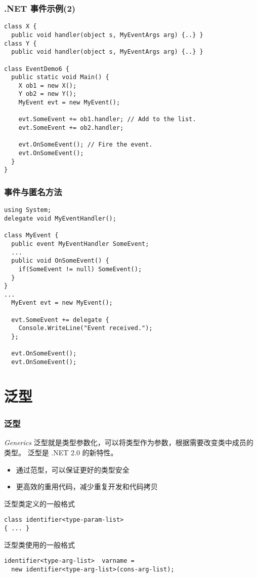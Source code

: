 \begin{frame}[fragile]
\frametitle{.NET 事件示例(2)}
\begin{lstlisting}
class X {
  public void handler(object s, MyEventArgs arg) {..} }
class Y {
  public void handler(object s, MyEventArgs arg) {..} }

class EventDemo6 {
  public static void Main() {
    X ob1 = new X();
    Y ob2 = new Y();
    MyEvent evt = new MyEvent();

    evt.SomeEvent += ob1.handler; // Add to the list.
    evt.SomeEvent += ob2.handler;

    evt.OnSomeEvent(); // Fire the event.
    evt.OnSomeEvent();
  }
}
\end{lstlisting}
\end{frame}

\begin{frame}[fragile]
\frametitle{事件与匿名方法}
\begin{lstlisting}
using System;
delegate void MyEventHandler();

class MyEvent {
  public event MyEventHandler SomeEvent;
  ...
  public void OnSomeEvent() {
    if(SomeEvent != null) SomeEvent();
  }
}
...
  MyEvent evt = new MyEvent();

  evt.SomeEvent += delegate {
    Console.WriteLine("Event received.");
  };

  evt.OnSomeEvent();
  evt.OnSomeEvent();

\end{lstlisting}

\end{frame}

\section{泛型}

\begin{frame}[fragile]
\frametitle{泛型}
\begin{block}{\textit{Generics}}
  \CJKindent 泛型就是类型参数化，可以将类型作为参数，根据需要改变类中成员的类型。
  泛型是 .NET 2.0 的新特性。
\end{block}
\pause
\begin{itemize}
\item 通过范型，可以保证更好的类型安全
\item 更高效的重用代码，减少重复开发和代码拷贝
\end{itemize}
\pause
泛型类定义的一般格式
\begin{lstlisting}
class identifier<type-param-list>
{ ... }
\end{lstlisting}
泛型类使用的一般格式
\begin{lstlisting}
identifier<type-arg-list>  varname =
  new identifier<type-arg-list>(cons-arg-list);
\end{lstlisting}
\end{frame}


